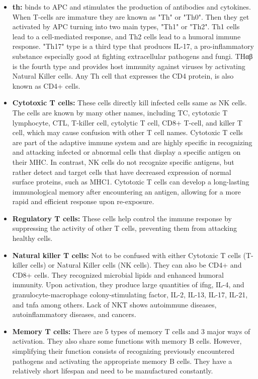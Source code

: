 \begin{itemize}
            \begin{itemize}
    
                \item{\textbf{\gls{th}:}} binds to APC and stimulates the production of antibodies and cytokines. When T-cells are immature they are known as "Th" or "Th0". Then they get activated by APC turning into two main types, "Th1" or "Th2". Th1 cells lead to a cell-mediated response, and Th2 cells lead to a humoral immune response. "Th17" type is a third type that produces IL-17, a pro-inflammatory substance especially good at fighting extracellular pathogens and fungi. THαβ is the fourth type and provides host immunity against viruses by activating Natural Killer cells. Any Th cell that expresses the CD4 protein, is also known as CD4+ cells.
        
                \item{\textbf{Cytotoxic T cells:}} These cells directly kill infected cells same as NK cells. The cells are known by many other names, including TC, cytotoxic T lymphocyte, CTL, T-killer cell, cytolytic T cell, CD8+ T-cell, and killer T cell, which may cause confusion with other T cell names. Cytotoxic T cells are part of the adaptive immune system and are highly specific in recognizing and attacking infected or abnormal cells that display a specific antigen on their MHC. In contrast, NK cells do not recognize specific antigens, but rather detect and target cells that have decreased expression of normal surface proteins, such as MHC1. Cytotoxic T cells can develop a long-lasting immunological memory after encountering an antigen, allowing for a more rapid and efficient response upon re-exposure.
        
                \item{\textbf{Regulatory T cells:}} These cells help control the immune response by suppressing the activity of other T cells, preventing them from attacking healthy cells.
        
                \item{\textbf{Natural killer T cells:}} Not to be confused with either Cytotoxic T cells (T-killer cells) or Natural Killer cells (NK cells). They can also be CD4+ and CD8+ cells. They recognized microbial lipids and enhanced humoral immunity. Upon activation, they produce large quantities of \gls{ifng}, IL-4, and granulocyte-macrophage colony-stimulating factor, IL-2, IL-13, IL-17, IL-21, and \gls{tnfa} among others. Lack of NKT shows autoimmune diseases, autoinflammatory diseases, and cancers.
        
                \item{\textbf{Memory T cells:}} There are 5 types of memory T cells and 3 major ways of activation. They also share some functions with memory B cells. However, simplifying their function consists of recognizing previously encountered pathogens and activating the appropriate memory B cells. They have a relatively short lifespan and need to be manufactured constantly.
    
            \end{itemize}
        
    \end{itemize}


